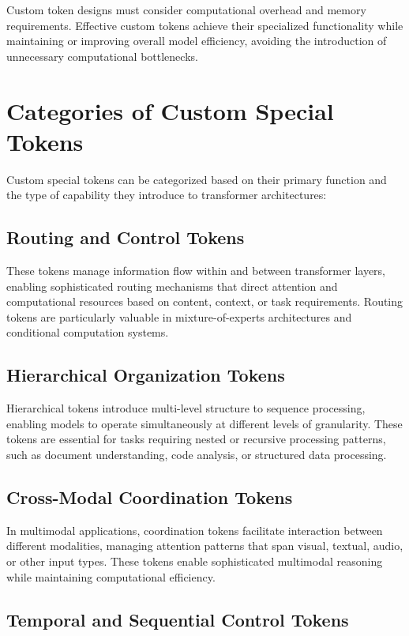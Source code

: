 Custom token designs must consider computational overhead and memory requirements. Effective custom tokens achieve their specialized functionality while maintaining or improving overall model efficiency, avoiding the introduction of unnecessary computational bottlenecks.

\section{Categories of Custom Special Tokens}

Custom special tokens can be categorized based on their primary function and the type of capability they introduce to transformer architectures:

\subsection{Routing and Control Tokens}

These tokens manage information flow within and between transformer layers, enabling sophisticated routing mechanisms that direct attention and computational resources based on content, context, or task requirements. Routing tokens are particularly valuable in mixture-of-experts architectures and conditional computation systems.

\subsection{Hierarchical Organization Tokens}

Hierarchical tokens introduce multi-level structure to sequence processing, enabling models to operate simultaneously at different levels of granularity. These tokens are essential for tasks requiring nested or recursive processing patterns, such as document understanding, code analysis, or structured data processing.

\subsection{Cross-Modal Coordination Tokens}

In multimodal applications, coordination tokens facilitate interaction between different modalities, managing attention patterns that span visual, textual, audio, or other input types. These tokens enable sophisticated multimodal reasoning while maintaining computational efficiency.

\subsection{Temporal and Sequential Control Tokens}

